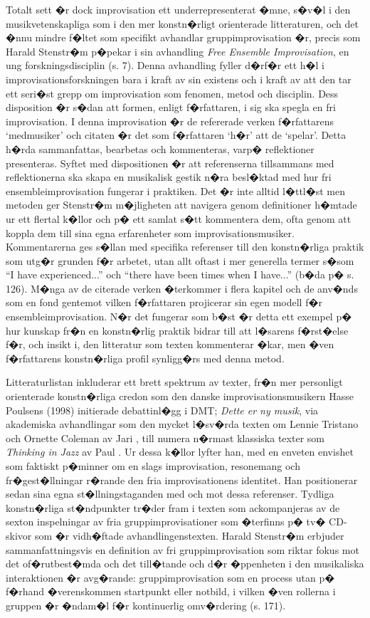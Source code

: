 \documentclass[a4paper]{article}
\begin{document}
Totalt sett �r dock improvisation ett underrepresenterat �mne, s�v�l i den musikvetenskapliga som i den mer konstn�rligt orienterade litteraturen, och det �nnu mindre f�ltet som specifikt avhandlar gruppimprovisation �r, precis som Harald Stenstr�m p�pekar i sin avhandling \emph{Free Ensemble Improvisation}, en ung forskningsdisciplin (s. 7). Denna avhandling fyller d�rf�r ett h�l i improvisationsforskningen bara i kraft av sin existens och i kraft av att den tar ett seri�st grepp om improvisation som fenomen, metod och disciplin. Dess disposition �r s�dan att formen, enligt f�rfattaren, i sig ska spegla en fri improvisation. I denna improvisation �r de refererade verken f�rfattarens `medmusiker' och citaten �r det som f�rfattaren `h�r' att de `spelar'. Detta h�rda sammanfattas, bearbetas och kommenteras, varp� reflektioner presenteras. Syftet med dispositionen �r att referenserna tillsammans med reflektionerna ska skapa en musikalisk gestik n�ra besl�ktad med hur fri ensembleimprovisation fungerar i praktiken. Det �r inte alltid l�ttl�st men metoden ger Stenstr�m m�jligheten att navigera genom definitioner h�mtade ur ett flertal k�llor och p� ett samlat s�tt kommentera dem, ofta genom att koppla dem till sina egna erfarenheter som improvisationsmusiker. Kommentarerna ges s�llan med specifika referenser till den konstn�rliga praktik som utg�r grunden f�r arbetet, utan allt oftast i mer generella termer s�som ``I have experienced...'' och ``there have been times when I have...'' (b�da p� s. 126). M�nga av de citerade verken �terkommer i flera kapitel och de anv�nds som en fond gentemot vilken f�rfattaren projicerar sin egen modell f�r ensembleimprovisation. N�r det fungerar som b�st �r detta ett exempel p� hur kunskap fr�n en konstn�rlig praktik bidrar till att l�sarens f�rst�else f�r, och insikt i, den litteratur som texten kommenterar �kar, men �ven f�rfattarens konstn�rliga profil synligg�rs med denna metod.

Litteraturlistan inkluderar ett brett spektrum av texter, fr�n mer personligt orienterade konstn�rliga credon som den danske improvisationsmusikern Hasse Poulsens (1998) initierade debattinl�gg i DMT; \emph{Dette er ny musik}, via akademiska avhandlingar som den mycket l�sv�rda texten om Lennie Tristano och Ornette Coleman av Jari \citet{perkiomaki02}, till numera n�rmast klassiska texter som \emph{Thinking in Jazz} av Paul \citet{berliner94}. Ur dessa k�llor lyfter han, med en enveten envishet som faktiskt p�minner om en slags improvisation, resonemang och fr�gest�llningar r�rande den fria improvisationens identitet. Han positionerar sedan sina egna st�llningstaganden med och mot dessa referenser. Tydliga konstn�rliga st�ndpunkter tr�der fram i texten som ackompanjeras av de sexton inspelningar av fria gruppimprovisationer som �terfinns p� tv� CD-skivor som �r vidh�ftade avhandlingenstexten. Harald Stenstr�m erbjuder sammanfattningsvis en definition av fri gruppimprovisation som riktar fokus mot det of�rutbest�mda och det till�tande och d�r �ppenheten i den musikaliska interaktionen �r avg�rande: gruppimprovisation som en process utan p� f�rhand �verenskommen startpunkt eller notbild, i vilken �ven rollerna i gruppen �r �ndam�l f�r kontinuerlig omv�rdering (s. 171).
\end{document}
